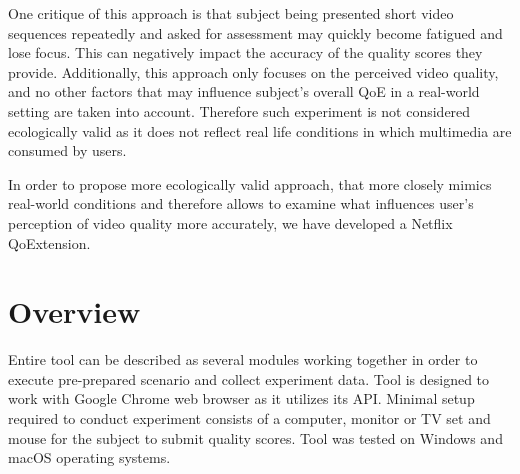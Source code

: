 \documentclass[conference]{IEEEtran}
\begin{document}
One critique of this approach is that subject being presented short video sequences repeatedly and asked for assessment may quickly become fatigued and lose focus. This can negatively impact the accuracy of the quality scores they provide. 
Additionally, this approach only focuses on the perceived video quality, and no other factors that may influence subject's overall QoE in a real-world setting are taken into account.
Therefore such experiment is not considered ecologically valid as it does not reflect real life conditions in which multimedia are consumed by users.

In order to propose more ecologically valid approach, that more closely mimics real-world conditions and therefore allows to examine what influences user's perception of video quality more accurately, we have developed a Netflix QoExtension.

\section{Overview}
\label{sec:Overview}
Entire tool can be described as several modules working together in order to execute pre-prepared scenario and collect experiment data. 
Tool is designed to work with Google Chrome web browser as it utilizes its API.
Minimal setup required to conduct experiment consists of a computer, monitor or TV set and mouse for the subject to submit quality scores. 
Tool was tested on Windows and macOS operating systems.







\printbibliography
\end{document}
